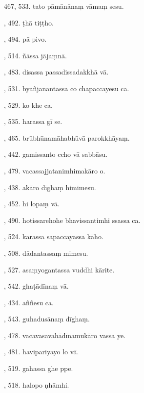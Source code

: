 467, 533. tato pāmānānaṃ vāmaṃ sesu.\hfill \pageref{sut:467}\par {}, 492. ṭhā tiṭṭho.\hfill \pageref{sut:468}\par {}, 494. pā pivo.\hfill \pageref{sut:469}\par {}, 514. ñāssa jājaṃnā.\hfill \pageref{sut:470}\par {}, 483. disassa passadissadakkhā vā.\hfill \pageref{sut:471}\par {}, 531. byañjanantassa co chapaccayesu ca.\hfill \pageref{sut:472}\par {}, 529. ko khe ca.\hfill \pageref{sut:473}\par {}, 535. harassa gī se.\hfill \pageref{sut:474}\par {}, 465. brūbhūnamāhabhūvā parokkhāyaṃ.\hfill \pageref{sut:475}\par {}, 442. gamissanto ccho vā sabbāsu.\hfill \pageref{sut:476}\par {}, 479. vacassajjatanimhimakāro o.\hfill \pageref{sut:477}\par {}, 438. akāro dīghaṃ himimesu.\hfill \pageref{sut:478}\par {}, 452. hi lopaṃ vā.\hfill \pageref{sut:479}\par {}, 490. hotissarehohe bhavissantimhi ssassa ca.\hfill \pageref{sut:480}\par {}, 524. karassa sapaccayassa kāho.\hfill \pageref{sut:481}\par {}, 508. dādantassaṃ mimesu.\hfill \pageref{sut:482}\par {}, 527. asaṃyogantassa vuddhi kārite.\hfill \pageref{sut:483}\par {}, 542. ghaṭādīnaṃ vā.\hfill \pageref{sut:484}\par {}, 434. aññesu ca.\hfill \pageref{sut:485}\par {}, 543. guhadusānaṃ dīghaṃ.\hfill \pageref{sut:486}\par {}, 478. vacavasavahādīnamukāro vassa ye.\hfill \pageref{sut:487}\par {}, 481. havipariyayo lo vā.\hfill \pageref{sut:488}\par {}, 519. gahassa ghe ppe.\hfill \pageref{sut:489}\par {}, 518. halopo ṇhāmhi.\hfill \pageref{sut:490}\par \noindent
